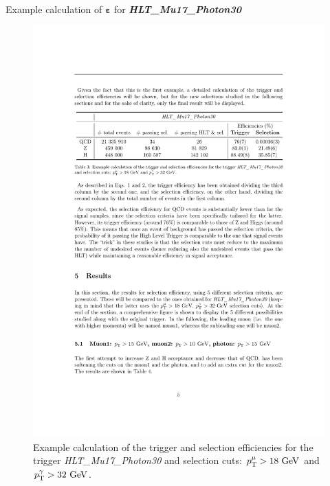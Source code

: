 \documentclass[aspectratio = 1610, xcolor = dvipsnames]{beamer}
\newcommand{\GeV}{\textrm{ }\mathrm{GeV}}
\newcommand{\pt}{p_{\rm T}}
\begin{document}
	
    \begin{frame}[t]{Example calculation of ${\pmb \varepsilon}$ for \textit{\textbf{HLT\_Mu17\_Photon30}}}
        
        \vspace{1cm}

        \begin{figure}[c]
            \centering
            \includegraphics[width=1\textwidth]{images/calcEfficiency_table.pdf}
            \caption{Example calculation of the trigger and selection efficiencies for the trigger {\it HLT\_Mu17\_Photon30} and selection cuts: $\pt^{\mu}>18\GeV$ and $\pt^{\gamma}>32\GeV$. \label{im:calcEfficiency_table}}
        \end{figure}

    \end{frame}
	
\end{document}
